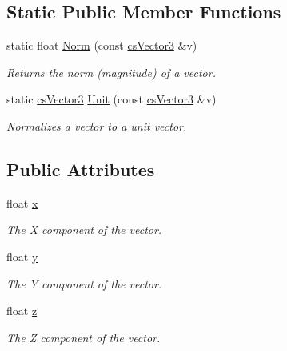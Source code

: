 \subsection*{Static Public Member Functions}
\begin{DoxyCompactItemize}
\item 
static float \hyperlink{classcsVector3_a710f2bd2de6b6e842774632e1654050e}{Norm} (const \hyperlink{classcsVector3}{cs\+Vector3} \&v)\hypertarget{classcsVector3_a710f2bd2de6b6e842774632e1654050e}{}\label{classcsVector3_a710f2bd2de6b6e842774632e1654050e}

\begin{DoxyCompactList}\small\item\em Returns the norm (magnitude) of a vector. \end{DoxyCompactList}\item 
static \hyperlink{classcsVector3}{cs\+Vector3} \hyperlink{classcsVector3_af438a4e42d69985e693dcbaf78cc9940}{Unit} (const \hyperlink{classcsVector3}{cs\+Vector3} \&v)\hypertarget{classcsVector3_af438a4e42d69985e693dcbaf78cc9940}{}\label{classcsVector3_af438a4e42d69985e693dcbaf78cc9940}

\begin{DoxyCompactList}\small\item\em Normalizes a vector to a unit vector. \end{DoxyCompactList}\end{DoxyCompactItemize}
\subsection*{Public Attributes}
\begin{DoxyCompactItemize}
\item 
float \hyperlink{classcsVector3_a823fdba459ff91e8a5e6834ded7c815f}{x}\hypertarget{classcsVector3_a823fdba459ff91e8a5e6834ded7c815f}{}\label{classcsVector3_a823fdba459ff91e8a5e6834ded7c815f}

\begin{DoxyCompactList}\small\item\em The X component of the vector. \end{DoxyCompactList}\item 
float \hyperlink{classcsVector3_ae0a74264b61eb5d61da63b3c101af719}{y}\hypertarget{classcsVector3_ae0a74264b61eb5d61da63b3c101af719}{}\label{classcsVector3_ae0a74264b61eb5d61da63b3c101af719}

\begin{DoxyCompactList}\small\item\em The Y component of the vector. \end{DoxyCompactList}\item 
float \hyperlink{classcsVector3_a3f761bd195c7ccec59ea863a87a1ad05}{z}\hypertarget{classcsVector3_a3f761bd195c7ccec59ea863a87a1ad05}{}\label{classcsVector3_a3f761bd195c7ccec59ea863a87a1ad05}

\begin{DoxyCompactList}\small\item\em The Z component of the vector. \end{DoxyCompactList}\end{DoxyCompactItemize}
